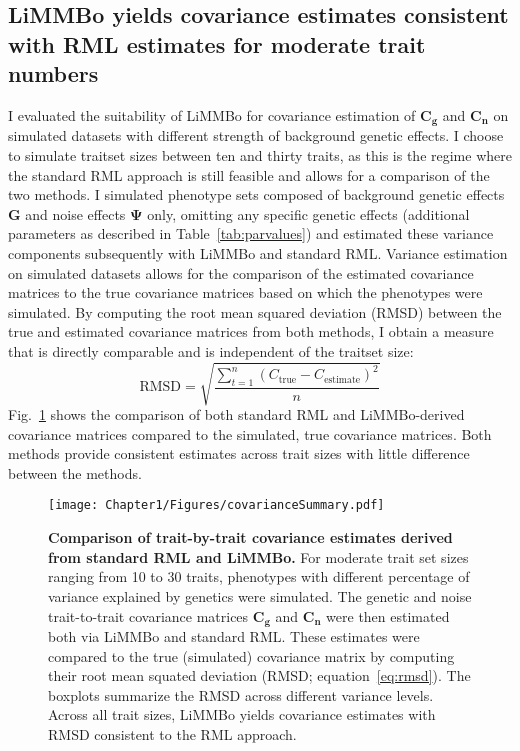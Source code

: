 \subsection{LiMMBo yields covariance estimates consistent with RML estimates for moderate trait numbers}
I evaluated the suitability of LiMMBo for covariance estimation of \(\mathbf{C_g}\) and \(\mathbf{C_n}\) on simulated datasets with different strength of background genetic effects. I choose to simulate traitset sizes between ten and thirty traits, as this is the regime where the standard RML approach is still feasible and allows for a comparison of the two methods. I simulated phenotype sets composed of background genetic effects $\mathbf{G}$ and noise effects $\mathbf{\Psi}$ only, omitting any specific genetic effects (additional parameters as described in Table~\ref{tab:parvalues}) and estimated these variance components subsequently with LiMMBo and standard RML. Variance estimation on simulated datasets allows for the comparison of the estimated covariance matrices to the true covariance matrices based on which the phenotypes were simulated. By computing the root mean squared deviation (RMSD) between the true and estimated covariance matrices from both methods, I obtain a measure that is directly comparable and is independent of the traitset size: 
\begin{equation}
\text{RMSD}=\sqrt{\frac{\sum_{t=1}^n (C_{\text{true}} - C_{\text{estimate}})^2}{n}}
\label{eq:rmsd}
\end{equation}
Fig.~\ref{fig:covsimilarity} shows the comparison of both standard RML and LiMMBo-derived covariance matrices compared to the simulated, true covariance matrices. Both methods provide consistent estimates across trait sizes with little difference between the methods.

\begin{figure}[hbtp]
	\centering	
	\texttt{[image: Chapter1/Figures/covarianceSummary.pdf]}\\
	\caption{\textbf{Comparison of trait-by-trait covariance estimates derived from standard RML and LiMMBo.} For moderate trait set sizes ranging from 10 to 30 traits, phenotypes with different percentage of variance explained by genetics were simulated. The genetic and noise trait-to-trait covariance matrices \(\mathbf{C_g}\) and \(\mathbf{C_n}\) were then estimated both via LiMMBo and standard RML. These estimates were compared to the true (simulated) covariance matrix by computing their root mean squated deviation (RMSD; equation~\ref{eq:rmsd}). The boxplots summarize the RMSD across different variance levels. Across all trait sizes, LiMMBo yields covariance estimates with RMSD consistent to the RML approach.}
	  \label{fig:covsimilarity}%
\end{figure}

